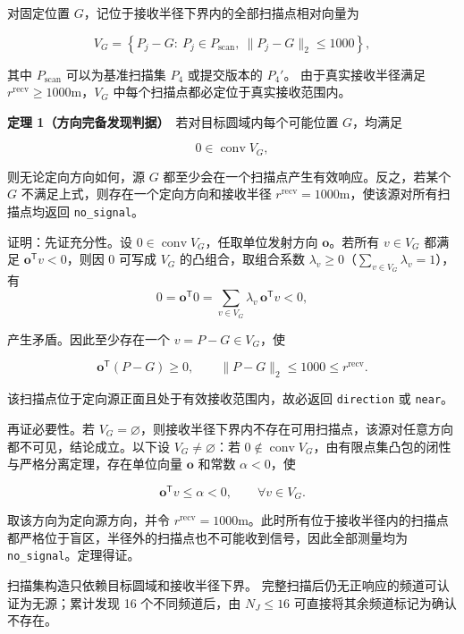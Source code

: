 对固定位置 $G$，记位于接收半径下界内的全部扫描点相对向量为

\begin{equation}
V_G=
\left\{
P_j-G:
\ P_j\in P_{\mathrm{scan}},\ 
\lVert P_j-G\rVert_2\le1000
\right\},
\label{eq:q4_relative_set}
\end{equation}

其中 $P_{\mathrm{scan}}$ 可以为基准扫描集 $P_4$ 或提交版本的 $P_4'$。
由于真实接收半径满足 $r^{\mathrm{recv}}\ge1000\mathrm{m}$，$V_G$ 中每个扫描点都必定位于真实接收范围内。

\textbf{定理 1（方向完备发现判据）}　若对目标圆域内每个可能位置 $G$，均满足

\begin{equation}
0\in\operatorname{conv}V_G,
\label{eq:q4_direction_certificate}
\end{equation}

则无论定向方向如何，源 $G$ 都至少会在一个扫描点产生有效响应。反之，若某个 $G$ 不满足上式，则存在一个定向方向和接收半径 $r^{\mathrm{recv}}=1000\mathrm{m}$，使该源对所有扫描点均返回 \texttt{no\_signal}。

证明：先证充分性。设 $0\in\operatorname{conv}V_G$，任取单位发射方向 $\boldsymbol o$。若所有 $v\in V_G$ 都满足 $\boldsymbol o^{\mathsf T}v<0$，则因 $0$ 可写成 $V_G$ 的凸组合，取组合系数 $\lambda_v\ge0$（$\sum_{v\in V_G}\lambda_v=1$），有
\[
0=\boldsymbol o^{\mathsf T}0=\sum_{v\in V_G}\lambda_v\,\boldsymbol o^{\mathsf T}v<0,
\]

产生矛盾。因此至少存在一个 $v=P-G\in V_G$，使

\[
\boldsymbol o^{\mathsf T}(P-G)\ge0,
\qquad
\lVert P-G\rVert_2\le1000\le r^{\mathrm{recv}}.
\]

该扫描点位于定向源正面且处于有效接收范围内，故必返回 \texttt{direction} 或 \texttt{near}。

再证必要性。若 $V_G=\varnothing$，则接收半径下界内不存在可用扫描点，该源对任意方向都不可见，结论成立。以下设 $V_G\ne\varnothing$：若 $0\notin\operatorname{conv}V_G$，由有限点集凸包的闭性与严格分离定理，存在单位向量 $\boldsymbol o$ 和常数 $\alpha<0$，使

\[
\boldsymbol o^{\mathsf T}v\le\alpha<0,
\qquad
\forall v\in V_G.
\]

取该方向为定向源方向，并令 $r^{\mathrm{recv}}=1000\mathrm{m}$。此时所有位于接收半径内的扫描点都严格位于盲区，半径外的扫描点也不可能收到信号，因此全部测量均为 \texttt{no\_signal}。定理得证。

扫描集构造只依赖目标圆域和接收半径下界。
完整扫描后仍无正响应的频道可认证为无源；累计发现 16 个不同频道后，由 $N_J\le16$ 可直接将其余频道标记为确认不存在。

